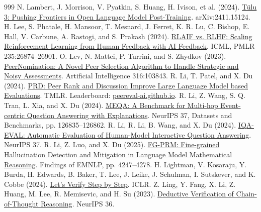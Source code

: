 \documentclass[12pt,letterpaper]{article}
\begin{document}
\begin{thebibliography}{999}
 N. Lambert, J. Morrison, V. Pyatkin, S. Huang, H. Ivison, et al. (2024). \href{https://arxiv.org/abs/2411.15124}{T\"ulu 3: Pushing Frontiers in Open Language Model Post-Training}. arXiv:2411.15124.
 H. Lee, S. Phatale, H. Mansoor, T. Mesnard, J. Ferret, K. R. Lu, C. Bishop, E. Hall, V. Carbune, A. Rastogi, and S. Prakash (2024). \href{https://proceedings.mlr.press/v235/lee24t.html}{RLAIF vs. RLHF: Scaling Reinforcement Learning from Human Feedback with AI Feedback}. ICML, PMLR 235:26874--26901.
 O. Lev, N. Mattei, P. Turrini, and S. Zhydkov (2023). \href{https://doi.org/10.1016/j.artint.2022.103843}{PeerNomination: A Novel Peer Selection Algorithm to Handle Strategic and Noisy Assessments}. Artificial Intelligence 316:103843.
 R. Li, T. Patel, and X. Du (2024). \href{https://openreview.net/forum?id=YVD1QqWRaj}{PRD: Peer Rank and Discussion Improve Large Language Model based Evaluations}. TMLR. Leaderboard: \href{https://peereval-ai.github.io}{peereval-ai.github.io}.
 R. Li, Z. Wang, S. Q. Tran, L. Xia, and X. Du (2024). \href{https://proceedings.neurips.cc/paper_files/paper/2024/hash/e560a0b22e4432003d0dba63ff8dc457-Abstract.html}{MEQA: A Benchmark for Multi-hop Event-centric Question Answering with Explanations}. NeurIPS 37, Datasets and Benchmarks, pp. 126835--126862.
 R. Li, R. Li, B. Wang, and X. Du (2024). \href{https://proceedings.neurips.cc/paper_files/paper/2024/file/c6a23b26eaaefd187973658f5001f4fe-Paper-Conference.pdf}{IQA-EVAL: Automatic Evaluation of Human-Model Interactive Question Answering}. NeurIPS 37.
 R. Li, Z. Luo, and X. Du (2025). \href{https://aclanthology.org/2025.findings-emnlp.228/}{FG-PRM: Fine-grained Hallucination Detection and Mitigation in Language Model Mathematical Reasoning}. Findings of EMNLP, pp. 4247--4278.
 H. Lightman, V. Kosaraju, Y. Burda, H. Edwards, B. Baker, T. Lee, J. Leike, J. Schulman, I. Sutskever, and K. Cobbe (2024). \href{https://openreview.net/forum?id=v8L0pN6EOi}{Let's Verify Step by Step}. ICLR.
 Z. Ling, Y. Fang, X. Li, Z. Huang, M. Lee, R. Memisevic, and H. Su (2023). \href{https://proceedings.neurips.cc/paper_files/paper/2023/hash/72393bd47a35f5b3bee4c609e7bba733-Abstract.html}{Deductive Verification of Chain-of-Thought Reasoning}. NeurIPS 36.

\end{thebibliography}
\end{document}
